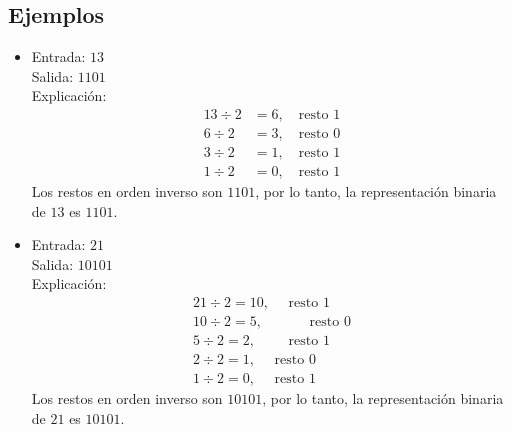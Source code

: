 \begin{enumerate}[label=\alph*)]
    \subsection*{Ejemplos}
    \begin{itemize}
        \item Entrada: \( 13 \) \\
        Salida: \( \text{1101} \) \\
        Explicación:
        \[
        \begin{aligned}
        13 \div 2 &= 6, \quad \text{resto } 1 \\
        6 \div 2 &= 3, \quad \text{resto } 0 \\
        3 \div 2 &= 1, \quad \text{resto } 1 \\
        1 \div 2 &= 0, \quad \text{resto } 1
        \end{aligned}
        \]
        Los restos en orden inverso son \(1101\), por lo tanto, la representación binaria de \(13\) es \(1101\).

        \item Entrada: \( 21 \) \\
        Salida: \( \text{10101} \) \\
        Explicación:
        \[
        \begin{aligned}
        21 \div 2 = 10,\quad \text{ resto } 1 \\
        10 \div 2 = 5,\quad\quad\quad \text{ resto } 0 \\
        5 \div 2 = 2,\quad\quad \text{ resto } 1 \\
        2 \div 2 = 1,\quad \text{ resto } 0 \\
        1 \div 2 = 0,\quad \text{ resto } 1
        \end{aligned}
        \]
        Los restos en orden inverso son \(10101\), por lo tanto, la representación binaria de \(21\) es \(10101\).
    \end{itemize}
\end{enumerate}
